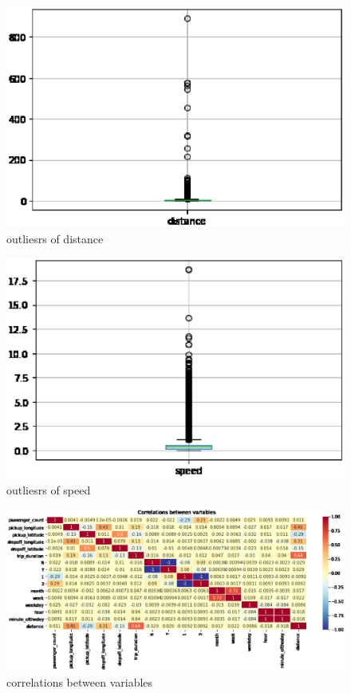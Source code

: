 \begin{figure}[h]
	\centering
	\includegraphics[scale=0.3]{distance.eps}
	\caption{outliesrs of distance}
\end{figure}
\begin{figure}[h]
	\centering
	\includegraphics[scale=0.3]{speed.eps}
	\caption{outliesrs of speed}
\end{figure}
\begin{figure}[h]
	\centering
	\includegraphics[scale=0.3]{correlations between variables.eps}
	\caption{correlations between variables}
\end{figure}


